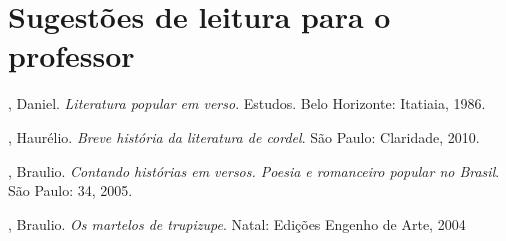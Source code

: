\section{Sugestões de leitura para o professor} 

\begin{bibliohedra}

, Daniel. \textit{Literatura popular em verso}. Estudos. Belo Horizonte: Itatiaia, 1986. 

, Haurélio. \textit{Breve história da literatura de cordel}. São Paulo: Claridade, 2010.

, Braulio. \textit{Contando histórias em versos. Poesia e romanceiro popular no Brasil}. São Paulo: 34, 2005.

, Braulio. \textit{Os martelos de trupizupe}. Natal: Edições Engenho de Arte, 2004 

\end{bibliohedra}

\paginabranca
\paginabranca
\paginabranca
\paginabranca
\paginabranca
\paginabranca
\paginabranca
\paginabranca
